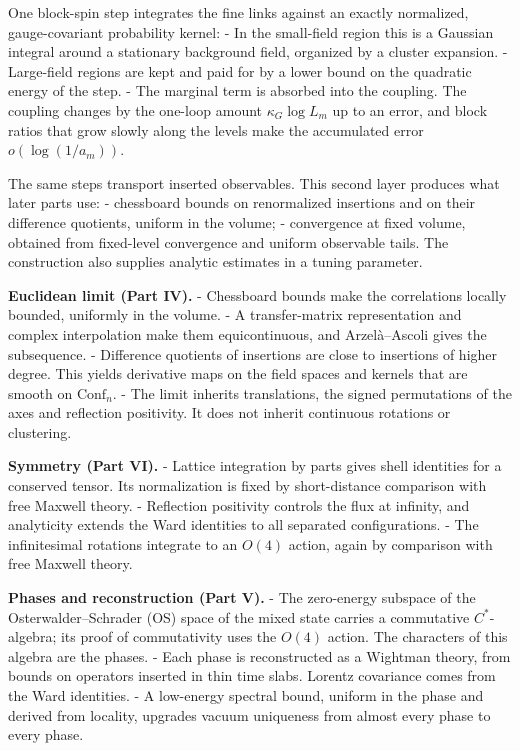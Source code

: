 \documentclass[
  letterpaper,
  11pt]{article}
\begin{document}
One block-spin step integrates the fine links against an exactly
normalized, gauge-covariant probability kernel: - In the small-field
region this is a Gaussian integral around a stationary background field,
organized by a cluster expansion. - Large-field regions are kept and
paid for by a lower bound on the quadratic energy of the step. - The
marginal term is absorbed into the coupling. The coupling changes by the
one-loop amount \(\kappa_G\log L_m\) up to an error, and block ratios
that grow slowly along the levels make the accumulated error
\(o(\log(1/a_m))\).

The same steps transport inserted observables. This second layer
produces what later parts use: - chessboard bounds on renormalized
insertions and on their difference quotients, uniform in the volume; -
convergence at fixed volume, obtained from fixed-level convergence and
uniform observable tails. The construction also supplies analytic
estimates in a tuning parameter.

\textbf{Euclidean limit (Part IV).} - Chessboard bounds make the
correlations locally bounded, uniformly in the volume. - A
transfer-matrix representation and complex interpolation make them
equicontinuous, and Arzelà--Ascoli gives the subsequence. - Difference
quotients of insertions are close to insertions of higher degree. This
yields derivative maps on the field spaces and kernels that are smooth
on \(\mathrm{Conf}_n\). - The limit inherits translations, the signed
permutations of the axes and reflection positivity. It does not inherit
continuous rotations or clustering.

\textbf{Symmetry (Part VI).} - Lattice integration by parts gives shell
identities for a conserved tensor. Its normalization is fixed by
short-distance comparison with free Maxwell theory. - Reflection
positivity controls the flux at infinity, and analyticity extends the
Ward identities to all separated configurations. - The infinitesimal
rotations integrate to an \(O(4)\) action, again by comparison with free
Maxwell theory.

\textbf{Phases and reconstruction (Part V).} - The zero-energy subspace
of the Osterwalder--Schrader (OS) space of the mixed state carries a
commutative \(C^\ast\)-algebra; its proof of commutativity uses the
\(O(4)\) action. The characters of this algebra are the phases. - Each
phase is reconstructed as a Wightman theory, from bounds on operators
inserted in thin time slabs. Lorentz covariance comes from the Ward
identities. - A low-energy spectral bound, uniform in the phase and
derived from locality, upgrades vacuum uniqueness from almost every
phase to every phase.
\end{document}
